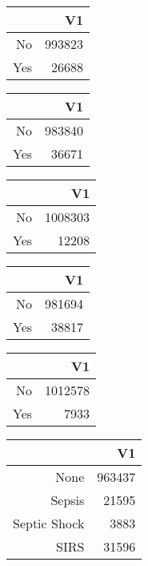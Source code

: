 \bigskip\bigskip
\centering
\begin{tabular}{rr}
  \hline
 & V1 \\ 
  \hline
No & 993823 \\ 
  Yes & 26688 \\ 
   \hline
\end{tabular}

\bigskip\bigskip
\centering
\begin{tabular}{rr}
  \hline
 & V1 \\ 
  \hline
No & 983840 \\ 
  Yes & 36671 \\ 
   \hline
\end{tabular}

\bigskip\bigskip
\centering
\begin{tabular}{rr}
  \hline
 & V1 \\ 
  \hline
No & 1008303 \\ 
  Yes & 12208 \\ 
   \hline
\end{tabular}

\bigskip\bigskip
\centering
\begin{tabular}{rr}
  \hline
 & V1 \\ 
  \hline
No & 981694 \\ 
  Yes & 38817 \\ 
   \hline
\end{tabular}

\bigskip\bigskip
\centering
\begin{tabular}{rr}
  \hline
 & V1 \\ 
  \hline
No & 1012578 \\ 
  Yes & 7933 \\ 
   \hline
\end{tabular}

\bigskip\bigskip
\centering
\begin{tabular}{rr}
  \hline
 & V1 \\ 
  \hline
None & 963437 \\ 
  Sepsis & 21595 \\ 
  Septic Shock & 3883 \\ 
  SIRS & 31596 \\ 
   \hline
\end{tabular}

